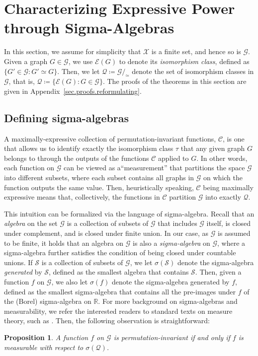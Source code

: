 \documentclass{article}
\newtheorem{proposition}{Proposition}
\def\Gfun{\mathcal{G}}
\def\Qfun{\mathcal{Q}}
\begin{document}
\section{Characterizing Expressive Power through Sigma-Algebras}
\label{sec.sigma}
In this section, we assume for simplicity that $\mathcal{X}$ is a finite set, and hence so is $\Gfun$. Given a graph $G \in \Gfun$, we use $\mathcal{E}(G)$ to denote its \emph{isomorphism class}, defined as $\{ G' \in \Gfun: G' \simeq G \}$. Then, we let $\Qfun \coloneqq \Gfun /_\simeq $ denote the set of isomorphism classes in $\Gfun$, that is, 
$\Qfun \coloneqq \{ \mathcal{E}(G): G \in \Gfun \}$. The proofs of the theorems in this section are given in Appendix~\ref{sec.proofs.reformulating}.
\subsection{Defining sigma-algebras}

A maximally-expressive collection of permutation-invariant functions, $\mathcal{C}$, is one that allows us to identify exactly the isomorphism class $\tau$ that any given graph $G$ belongs to through the outputs of the functions $\mathcal{C}$ applied to $G$. 
In other words, each function on $\Gfun$ can be viewed as a``measurement'' that partitions the space $\Gfun$ into different subsets, where each subset contains all graphs in $\Gfun$ on which the function outputs the same value. Then, heuristically speaking, $\mathcal{C}$ being maximally expressive means that, collectively, the functions in $\mathcal{C}$ partition $\Gfun$ into exactly $\Qfun$.

This intuition can be formalized via the language of sigma-algebra. Recall that an \emph{algebra} on the set $\Gfun$ is a collection of subsets of $\Gfun$ that includes $\Gfun$ itself, is closed under complement, and is closed under finite union. In our case, as $\Gfun$ is assumed to be finite, it holds that an algebra on $\Gfun$ is also a \emph{sigma-algebra} on $\Gfun$, where a sigma-algebra further satisfies the condition of being closed under countable unions. If $\mathcal{S}$ is a collection of subsets of $\Gfun$, we let $\sigma(\mathcal{S})$ denote the sigma-algebra \emph{generated} by $\mathcal{S}$, defined as the smallest algebra that contains $\mathcal{S}$. Then, given a function $f$ on $\Gfun$, we also let $\sigma(f)$ denote the sigma-algebra generated by $f$, defined as the smallest sigma-algebra that contains all the pre-images under $f$ of the (Borel) sigma-algebra on $\mathbb{R}$. For more background on sigma-algebras and measurability, we refer the interested readers to standard texts on measure theory, such as \cite{bartle2014elements}.
Then, the following observation is straightforward:
\begin{proposition}
\label{prop:measurable}
A function $f$ on $\Gfun$ is permutation-invariant if and only if $f$ is measurable with respect to $\sigma(\Qfun)$.
\end{proposition}
\end{document}
